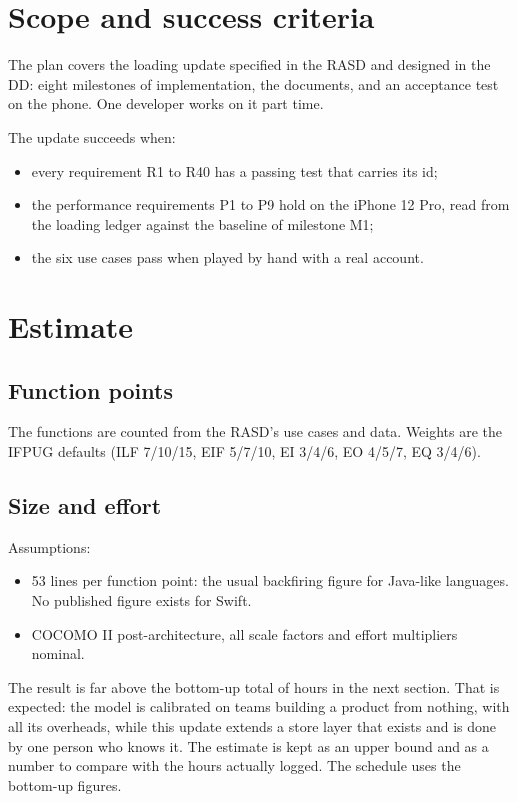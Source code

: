 \documentclass[plan]{se2doc}
\begin{document}
\maketitle

\section{Scope and success criteria}
The plan covers the loading update specified in the RASD and designed in the DD:
eight milestones of implementation, the documents, and an acceptance test on the
phone. One developer works on it part time.

The update succeeds when:
\begin{itemize}
  \item every requirement R1 to R40 has a passing test that carries its id;
  \item the performance requirements P1 to P9 hold on the iPhone 12 Pro, read from the loading ledger against the baseline of milestone M1;
  \item the six use cases pass when played by hand with a real account.
\end{itemize}

\section{Estimate}
\subsection{Function points}
The functions are counted from the RASD's use cases and data. Weights are the IFPUG
defaults (ILF 7/10/15, EIF 5/7/10, EI 3/4/6, EO 4/5/7, EQ 3/4/6).


\subsection{Size and effort}

Assumptions:
\begin{itemize}
  \item 53 lines per function point: the usual backfiring figure for Java-like languages. No published figure exists for Swift.
  \item COCOMO II post-architecture, all scale factors and effort multipliers nominal.
\end{itemize}
The result is far above the bottom-up total of \planbac{} hours in the next
section. That is expected: the model is calibrated on teams building a product
from nothing, with all its overheads, while this update extends a store layer that
exists and is done by one person who knows it. The estimate is kept as an upper
bound and as a number to compare with the hours actually logged. The schedule
uses the bottom-up figures.
\end{document}
